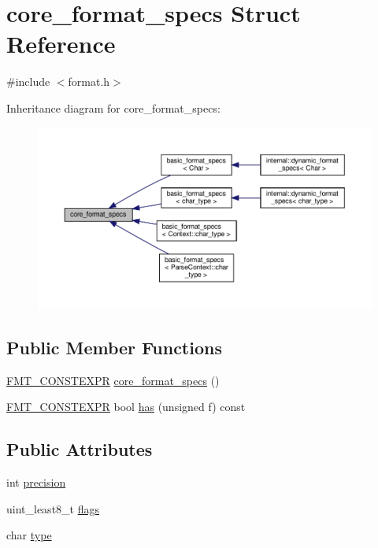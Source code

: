 \hypertarget{structcore__format__specs}{}\section{core\+\_\+format\+\_\+specs Struct Reference}
\label{structcore__format__specs}


{\ttfamily \#include $<$format.\+h$>$}



Inheritance diagram for core\+\_\+format\+\_\+specs\+:
\nopagebreak
\begin{figure}[H]
\begin{center}
\leavevmode
\includegraphics[width=350pt]{structcore__format__specs__inherit__graph}
\end{center}
\end{figure}
\subsection*{Public Member Functions}
\begin{DoxyCompactItemize}
\item 
\hyperlink{core_8h_a69201cb276383873487bf68b4ef8b4cd}{F\+M\+T\+\_\+\+C\+O\+N\+S\+T\+E\+X\+PR} \hyperlink{structcore__format__specs_a06ea7bc4271a8c25cbda18f28b04004d}{core\+\_\+format\+\_\+specs} ()
\item 
\hyperlink{core_8h_a69201cb276383873487bf68b4ef8b4cd}{F\+M\+T\+\_\+\+C\+O\+N\+S\+T\+E\+X\+PR} bool \hyperlink{structcore__format__specs_ac782db831425212c5513c61bde1c8f20}{has} (unsigned f) const
\end{DoxyCompactItemize}
\subsection*{Public Attributes}
\begin{DoxyCompactItemize}
\item 
int \hyperlink{structcore__format__specs_a52fe6e071541f34125300fad18ae6bf9}{precision}
\item 
uint\+\_\+least8\+\_\+t \hyperlink{structcore__format__specs_af18d6b76f9ef9ea1506f0c4ac7a729ad}{flags}
\item 
char \hyperlink{structcore__format__specs_a2a253ba73f3cfb64fb9493cdde476535}{type}
\end{DoxyCompactItemize}


